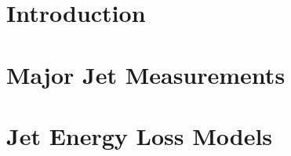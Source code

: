 \documentclass[fullpage, UKenglish]{uiucthesis2009}
\begin{document}
\chapter{Introduction}
\label{sec:theory}

\clearpage

\chapter{Major Jet Measurements}
\label{sec:jetMeasurements}

\clearpage

\chapter{Jet Energy Loss Models}
\label{sec:jetModels}

\clearpage

%
%
%
%
%

%
\end{document}
